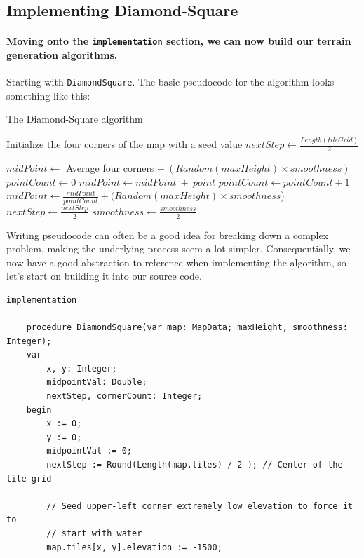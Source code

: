 \documentclass{article}
\begin{document}
\pagebreak


\subsection{Implementing Diamond-Square}

\paragraph{Moving onto the \texttt{implementation} section, we can now build our terrain generation algorithms.} Starting with \texttt{DiamondSquare}. The basic pseudocode for the algorithm looks something like this:

\begin{algorithm}[H]
\caption{The Diamond-Square algorithm}
\begin{algorithmic}
	\State Initialize the four corners of the map with a seed value
	\State $nextStep \gets \frac{Length(tileGrid)}{2}$
	
		  
			\State $midPoint \gets$ Average four corners $+ \ (Random(maxHeight) \times smoothness)$
		\EndFor
		 
			\State $pointCount \gets 0$
					\State $midPoint \gets midPoint \ + \ point$
					\State $pointCount\gets pointCount+1$
				\EndIf
			\EndFor
			\State $midPoint \gets \frac{midPoint}{pointCount} + (Random(maxHeight) \times smoothness$)
		\EndFor
		\State $nextStep \gets \frac{nextStep}{2}$ 
		\State $smoothness \gets \frac{smoothness}{2}$ 
	\EndWhile
	
\EndProcedure	
\end{algorithmic}
\end{algorithm}

Writing pseudocode can often be a good idea for breaking down a complex problem, making the underlying process seem a lot simpler. Consequentially, we now have a good abstraction to reference when implementing the algorithm, so let's start on building it into our source code.

\begin{verbatim}
implementation

	procedure DiamondSquare(var map: MapData; maxHeight, smoothness: Integer);
	var
		x, y: Integer;
		midpointVal: Double;
		nextStep, cornerCount: Integer;
	begin
		x := 0;
		y := 0;
		midpointVal := 0;
		nextStep := Round(Length(map.tiles) / 2 ); // Center of the tile grid

		// Seed upper-left corner extremely low elevation to force it to
		// start with water
		map.tiles[x, y].elevation := -1500;
\end{verbatim}
\end{document}
